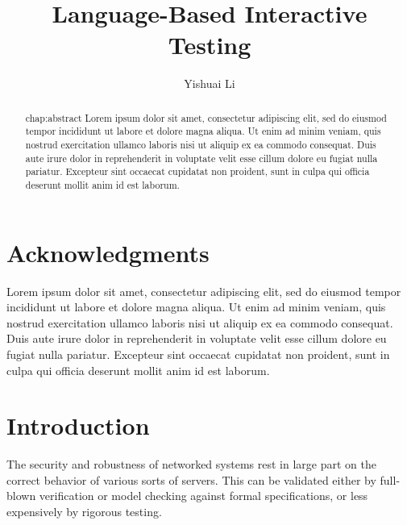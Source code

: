 \documentclass[12pt,oneside]{amsbook}
\title{Language-Based Interactive Testing}
\author{Yishuai Li}
\numberwithin{section}{chapter}
\numberwithin{figure}{chapter}
\numberwithin{equation}{chapter}
\begin{document}
\frontmatter

\maketitle

\copyrightpage

\chapter*{Acknowledgments}
\label{chap:acknowledgments}

Lorem ipsum dolor sit amet, consectetur adipiscing elit, sed do eiusmod tempor
incididunt ut labore et dolore magna aliqua. Ut enim ad minim veniam, quis
nostrud exercitation ullamco laboris nisi ut aliquip ex ea commodo
consequat. Duis aute irure dolor in reprehenderit in voluptate velit esse cillum
dolore eu fugiat nulla pariatur. Excepteur sint occaecat cupidatat non proident,
sunt in culpa qui officia deserunt mollit anim id est laborum.


\begin{abstract}{chap:abstract}
  Lorem ipsum dolor sit amet, consectetur adipiscing elit, sed do eiusmod tempor
  incididunt ut labore et dolore magna aliqua. Ut enim ad minim veniam, quis
  nostrud exercitation ullamco laboris nisi ut aliquip ex ea commodo
  consequat. Duis aute irure dolor in reprehenderit in voluptate velit esse
  cillum dolore eu fugiat nulla pariatur. Excepteur sint occaecat cupidatat non
  proident, sunt in culpa qui officia deserunt mollit anim id est laborum.
\end{abstract}

\tableofcontents
\listoffigures

\mainmatter

\chapter{Introduction}
\label{chap:introduction}

The security and robustness of networked systems rest in large part on the
correct behavior of various sorts of servers.  This can be validated either by
full-blown verification or model checking against formal specifications, or
less expensively by rigorous testing.
\end{document}
